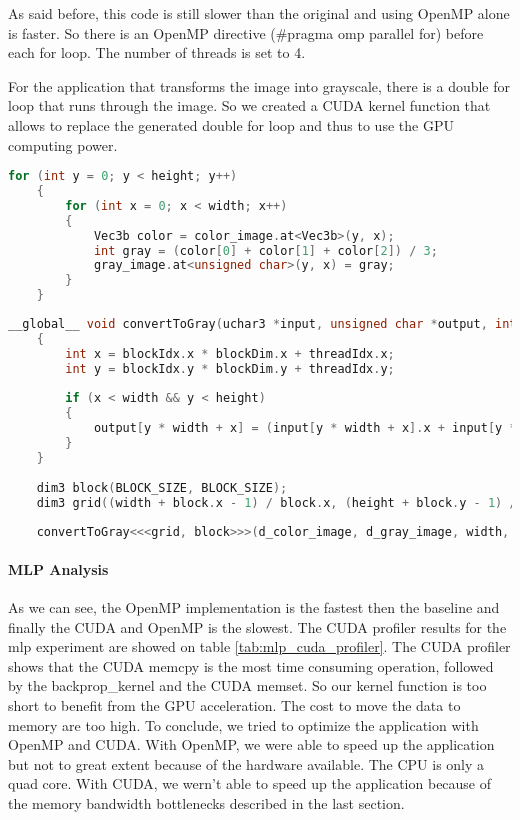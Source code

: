 \documentclass[11pt]{article}
\begin{document}
As said before, this code is still slower than the original and using OpenMP alone is faster.
So there is an OpenMP directive (\#pragma omp parallel for) before each for loop.
The number of threads is set to 4.

For the application that transforms the image into grayscale, there is a double for loop that runs through the image.
So we created a CUDA kernel function that allows to replace the generated double for loop and thus to use the GPU computing power.

\begin{lstlisting}[language=C, caption="Original grayscale code"]
	for (int y = 0; y < height; y++)
	{
		for (int x = 0; x < width; x++)
		{
			Vec3b color = color_image.at<Vec3b>(y, x);
			int gray = (color[0] + color[1] + color[2]) / 3;
			gray_image.at<unsigned char>(y, x) = gray;
		}
	}
\end{lstlisting}


\begin{lstlisting}[language=C, caption="CUDA kernel function to convert image to grayscale"]
	__global__ void convertToGray(uchar3 *input, unsigned char *output, int width, int height)
	{
		int x = blockIdx.x * blockDim.x + threadIdx.x;
		int y = blockIdx.y * blockDim.y + threadIdx.y;
	
		if (x < width && y < height)
		{
			output[y * width + x] = (input[y * width + x].x + input[y * width + x].y + input[y * width + x].z) / 3;
		}
	}
	
	dim3 block(BLOCK_SIZE, BLOCK_SIZE);
	dim3 grid((width + block.x - 1) / block.x, (height + block.y - 1) / block.y);
	
	convertToGray<<<grid, block>>>(d_color_image, d_gray_image, width, height);
\end{lstlisting}


\paragraph*{MLP Analysis} As we can see, the OpenMP implementation is the fastest then the baseline and finally the CUDA and OpenMP is the slowest.
The CUDA profiler results for the mlp experiment are showed on table \ref{tab:mlp_cuda_profiler}.
The CUDA profiler shows that the CUDA memcpy is the most time consuming operation, followed by the backprop\_kernel and the CUDA memset.
So our kernel function is too short to benefit from the GPU acceleration. The cost to move the data to memory are too high. 
To conclude, we tried to optimize the application with OpenMP and CUDA. 
With OpenMP, we were able to speed up the application but not to great extent because of the hardware available. The CPU is only a quad core.
With CUDA, we wern't able to speed up the application because of the memory bandwidth bottlenecks described in the last section.
\end{document}
